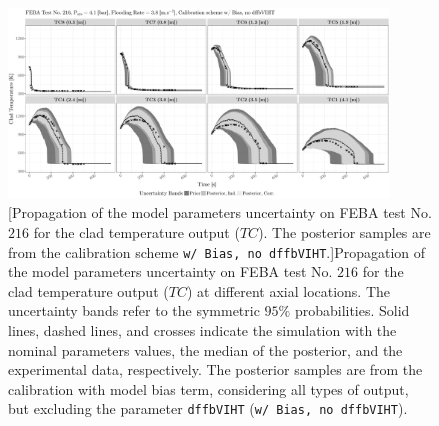 \clearpage
\begin{figure}
	\centering
	\includegraphics[width=0.90\textwidth]{../figures/chapter5/figures/plotTraceUQPosteriorAllDiscCenteredNoParam8TC216}
		[Propagation of the model parameters uncertainty on FEBA test No. $216$ for the clad temperature output ($TC$). The posterior samples are from the calibration scheme \texttt{w/ Bias, no dffbVIHT}.]{Propagation of the model parameters uncertainty on FEBA test No. $216$ for the clad temperature output ($TC$) at different axial locations. The uncertainty bands refer to the symmetric $95\%$ probabilities. Solid lines, dashed lines, and crosses indicate the simulation with the nominal parameters values, the median of the posterior, and the experimental data, respectively. The posterior samples are from the calibration with model bias term, considering all types of output, but excluding the parameter \texttt{dffbVIHT} (\texttt{w/ Bias, no dffbVIHT}).}
	\label{fig:ch5_plot_trace_uq_post_tc_216_noparam8}
\end{figure}
\clearpage

